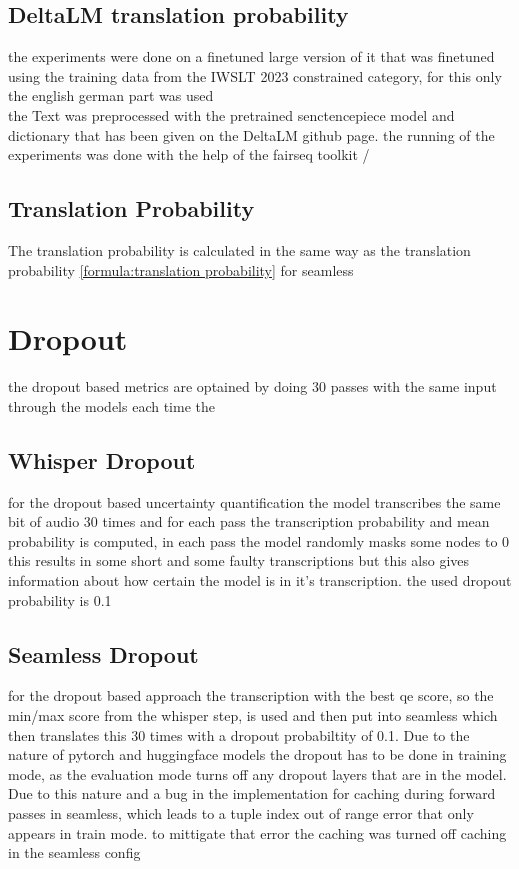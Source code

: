 \section{DeltaLM translation probability}
the experiments \cite{ma2021deltalm} were done on a finetuned large version of it that was finetuned using the training data from the IWSLT 2023 constrained category, for this only the english german part was used
\\
the Text was preprocessed with the pretrained senctencepiece model and dictionary that has been given on the DeltaLM github page. 
the running of the experiments was done with the help of the fairseq toolkit \cite{ott2019fairseqfastextensibletoolkit}/\cite{ott2019fairseq}



\section{Translation Probability}
The translation probability is calculated in the same way as the translation probability \ref{formula:translation probability} for seamless 
\chapter{Dropout}
the dropout based metrics are optained by doing 30 passes with the same input through the models each time the 
    

\section{Whisper Dropout}
for the dropout based uncertainty quantification the model transcribes the same bit of audio 30 times and for each pass the transcription probability and mean probability is computed, in each pass the model randomly masks some nodes to 0
this results in some short and some faulty transcriptions but this also gives information about how certain the model is in it's transcription. the used dropout probability is 0.1 


\section{Seamless Dropout}
for the dropout based approach the transcription with the best qe score, so the min/max score from the whisper step, is used 
and then put into seamless which then translates this 30 times with a dropout probabiltity of 0.1.
Due to the nature of pytorch and huggingface models the dropout has to be done in training mode, as the evaluation mode turns off any dropout layers that are in the model. Due to this nature and a bug in the implementation for caching during forward passes in seamless, which leads to a tuple index out of range error that only appears in train mode. to mittigate that error the caching was turned off caching in the seamless config

